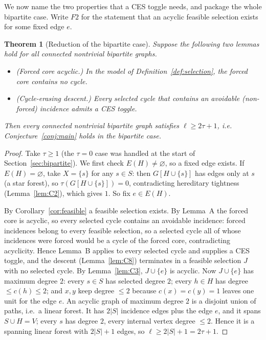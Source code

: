 \documentclass[11pt]{article}
\theoremstyle{plain}
\newtheorem{theorem}{Theorem}[section]
\theoremstyle{definition}
\newcommand{\FVS}{\tau}
\newcommand{\lf}{\ell}
\begin{document}
We now name the two properties that a CES toggle needs, and package the whole
bipartite case. Write $F2$ for the statement that an acyclic feasible selection
exists for some fixed edge $e$.

\begin{theorem}[Reduction of the bipartite case]\label{thm:F2}
Suppose the following two lemmas hold for all connected nontrivial bipartite
graphs.
\begin{itemize}
\item[\textbf{A.}] (Forced core acyclic.) In the model of
Definition~\ref{def:selection}, the forced core contains no cycle.
\item[\textbf{B.}] (Cycle-erasing descent.) Every selected cycle that contains an
avoidable (non-forced) incidence admits a CES toggle.
\end{itemize}
Then every connected nontrivial bipartite graph satisfies $\lf\ge2\FVS+1$, i.e.
Conjecture~\ref{conj:main} holds in the bipartite case.
\end{theorem}

\begin{proof}
Take $\FVS\ge1$ (the $\FVS=0$ case was handled at the start of
Section~\ref{sec:bipartite}). We first check $E(H)\ne\varnothing$, so a fixed
edge exists. If $E(H)=\varnothing$, take $X=\{s\}$ for any $s\in S$: then
$G[H\cup\{s\}]$ has edges only at $s$ (a star forest), so
$\FVS(G[H\cup\{s\}])=0$, contradicting hereditary tightness
(Lemma~\ref{lem:C2}), which gives $1$. So fix $e\in E(H)$.

By Corollary~\ref{cor:feasible} a feasible selection exists. By Lemma~A the
forced core is acyclic, so every selected cycle contains an avoidable incidence:
forced incidences belong to every feasible selection, so a selected cycle all of
whose incidences were forced would be a cycle of the forced core, contradicting
acyclicity. Hence Lemma~B applies to every selected cycle and supplies a CES
toggle, and the descent (Lemma~\ref{lem:C8}) terminates in a feasible selection
$J$ with no selected cycle. By Lemma~\ref{lem:C3}, $J\cup\{e\}$ is acyclic. Now $J\cup\{e\}$ has maximum degree $2$: every $s\in S$ has selected
degree $2$; every $h\in H$ has degree $\le c(h)\le2$; and $x,y$ keep degree
$\le2$ because $c(x)=c(y)=1$ leaves one unit for the edge $e$. An acyclic graph
of maximum degree $2$ is a disjoint union of paths, i.e.\ a linear forest. It has
$2|S|$ incidence edges plus the edge $e$, and it spans $S\cup H=V$; every $s$ has
degree $2$, every internal vertex degree $\le2$. Hence it is a spanning linear
forest with $2|S|+1$ edges, so $\lf\ge2|S|+1=2\FVS+1$.
\end{proof}
\end{document}

